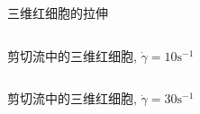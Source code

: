 \begin{frame}{三维红细胞的拉伸}
\begin{columns}
\begin{column}[c]{0.5\textwidth}
\begin{center}
%
\end{center}

\end{column}
\begin{column}[c]{0.5\textwidth}

\vspace{-2.6em}
\end{column}
\end{columns}
\end{frame}

\begin{frame}{剪切流中的三维红细胞, $\dot{\gamma}=10 \mathrm{s}^{-1}$}
\begin{columns}
\begin{column}[c]{0.5\textwidth}
\begin{center}
\end{center}
\end{column}
\begin{column}[c]{0.5\textwidth}

\vspace{-2.6em}
\end{column}
\end{columns}
\end{frame}

\begin{frame}{剪切流中的三维红细胞, $\dot{\gamma}=30 \mathrm{s}^{-1}$}
\begin{columns}
\begin{column}[c]{0.5\textwidth}
\begin{center}
\end{center}
\end{column}
\begin{column}[c]{0.5\textwidth}

\vspace{-2.6em}
\end{column}
\end{columns}
\end{frame}

